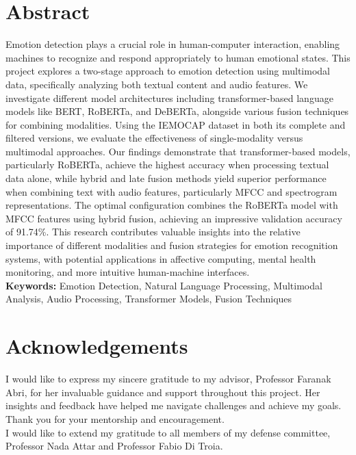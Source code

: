 \documentclass[12pt]{article}
\begin{document}

\doublespacing
\section*{Abstract}
\bigskip
Emotion detection plays a crucial role in human-computer interaction, enabling machines to recognize and respond appropriately to human emotional states. This project explores a two-stage approach to emotion detection using multimodal data, specifically analyzing both textual content and audio features. We investigate different model architectures including transformer-based language models like BERT, RoBERTa, and DeBERTa, alongside various fusion techniques for combining modalities. Using the IEMOCAP dataset in both its complete and filtered versions, we evaluate the effectiveness of single-modality versus multimodal approaches. Our findings demonstrate that transformer-based models, particularly RoBERTa, achieve the highest accuracy when processing textual data alone, while hybrid and late fusion methods yield superior performance when combining text with audio features, particularly MFCC and spectrogram representations. The optimal configuration combines the RoBERTa model with MFCC features using hybrid fusion, achieving an impressive validation accuracy of 91.74\%. This research contributes valuable insights into the relative importance of different modalities and fusion strategies for emotion recognition systems, with potential applications in affective computing, mental health monitoring, and more intuitive human-machine interfaces.\\

\noindent \textbf{Keywords:} Emotion Detection, Natural Language Processing, Multimodal Analysis, Audio Processing, Transformer Models, Fusion Techniques
\newpage
\section*{Acknowledgements}
I would like to express my sincere gratitude to my advisor, Professor Faranak Abri, for her invaluable guidance and support throughout this project. Her insights and feedback have helped me navigate challenges and achieve my goals. Thank you for your mentorship and encouragement.\\
  
\noindent
I would like to extend my gratitude to all members of my defense committee, Professor Nada Attar and Professor Fabio Di Troia.\\
\end{document}
